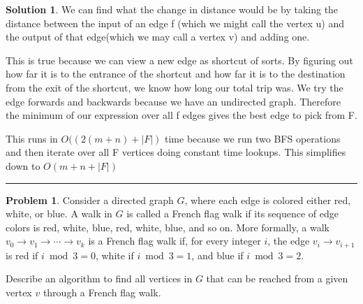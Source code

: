\documentclass{article}
\theoremstyle{definition}
\newtheorem{problem}{Problem}
\def\fline{\rule{0.75\linewidth}{0.5pt}}
\newcommand{\finishline}{\begin{center}\fline\end{center}}
\newtheorem*{solution*}{Solution}
\newenvironment{solution}{\begin{solution*}}{{\finishline} \end{solution*}}
\begin{document}
\begin{solution}
    We can find what the change in distance would be by taking the distance between the input of an edge f (which we might call the vertex u) and the output of that edge(which we may call a vertex v) and adding one.

    This is true because we can view a new edge as shortcut of sorts. By figuring out how far it is to the entrance of the shortcut and how far it is to the destination from the exit of the shortcut, we know how long our total trip was. We try the edge forwards and backwards because we have an undirected graph. Therefore the minimum of our expression over all f edges gives the best edge to pick from F.  




This runs in $O((2(m+n) + |F|)$ time because we run two BFS operations and then iterate over all F vertices doing constant time lookups. This simplifies down to $O(m + n + |F|)$ 


\end{solution}

\newpage




\begin{problem}
    Consider a directed graph $G$, where each edge is colored either red, white, or blue. A walk in $G$ is called a French flag walk if its sequence of edge colors is red, white, blue, red, white, blue, and so on. More formally, a walk $v_0 \rightarrow v_1 \rightarrow \cdots \rightarrow v_k$ is a French flag walk if, for every integer $i$, the edge $v_i \rightarrow v_{i+1}$ is red if $i \bmod 3=0$, white if $i \bmod 3=1$, and blue if $i \bmod 3=2$.

Describe an algorithm to find all vertices in $G$ that can be reached from a given vertex $v$ through a French flag walk. 
\end{problem}
\end{document}
